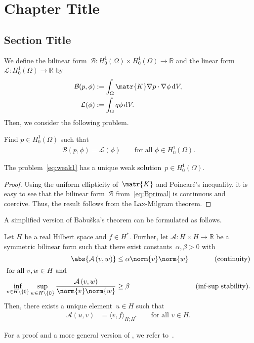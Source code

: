 \chapter{Chapter Title}\label{ch: ch2}%
\lipsum[14]

\section{Section Title}
We define the bilinear form~$\mathcal{B}\colon H_0^1 (\Omega ) \times H_0^1(\Omega ) \rightarrow \mathbb{R}$ and the linear form~$\mathcal{L}\colon H_0^1(\Omega ) \rightarrow \mathbb{R}$ by 
\begin{align}
\mathcal{B} ( p , \phi ) &:= \int_\Omega \matr{K} \nabla p \cdot \nabla \phi \,\mathrm{d} V , \label{eq:Bprimal}\\
\mathcal{L} (\phi ) &:= \int_\Omega q\phi \,\mathrm{d} V .
\end{align}
Then, we consider the following problem. 

Find $p\in H_0^1 (\Omega )$ such that 
\begin{align}
\mathcal{B} (p, \phi ) = \mathcal{L} ( \phi ) \qquad \text{for all } \phi \in H_0^1 (\Omega ) . \label{eq:weak1}
\end{align}

\begin{prop} \label{prop:weak1}
The problem~\eqref{eq:weak1} has a unique weak solution~$p\in H_0^1(\Omega )$.
\end{prop}
\begin{proof}
Using the uniform ellipticity of~$\matr{K}$ and Poincaré's inequality, it is easy to see that the bilinear form~$\mathcal{B}$ from~\cref{eq:Bprimal} is continuous and coercive. Thus, the result follows from the Lax-Milgram theorem.  
\end{proof}

A simplified version of Babuška's theorem can be formulated as follows.
\begin{thm} \label{thm:babuska}
Let $H$ be a real Hilbert space and $f \in H^\ast$. Further, let $\mathcal{A}\colon H \times H \rightarrow \mathbb{R}$ be a symmetric bilinear form such that there exist constants~$\alpha , \beta > 0$ with
\begin{align}
\abs{\mathcal{A}\left( v, w \right)} &\le \alpha \norm{v}\norm{w} &\text{(continuity)} \\
\intertext{for all $v,w \in H$ and}
\inf_{v \in H \setminus \{ 0 \} } \sup_{w\in H\setminus \{ 0 \}} \frac{\mathcal{A}\left( v,w\right)}{\norm{v}\norm{w}} &\ge \beta   &\text{(inf-sup stability).}
\end{align}
Then, there exists a unique element~$u\in H$ such that
\begin{align}
\mathcal{A} ( u, v ) &= \langle v, f \rangle_{H; H^\ast} \qquad \text{for all } v \in H.
\end{align}
\end{thm}
For a proof and a more general version of , we refer to~\cite[Thm..1]{aziz72}.

